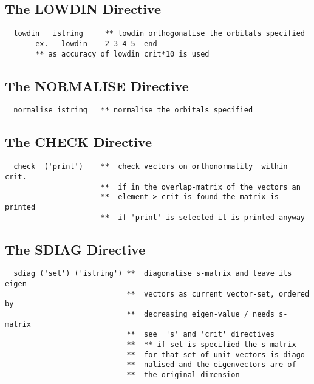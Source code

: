 \documentclass[11pt,fleqn]{article}
\begin{document}
\subsection{The LOWDIN Directive}

{
\footnotesize
\begin{verbatim} 
  lowdin   istring     ** lowdin orthogonalise the orbitals specified
       ex.   lowdin    2 3 4 5  end
       ** as accuracy of lowdin crit*10 is used
\end{verbatim}
}

\subsection{The NORMALISE Directive}

{
\footnotesize
\begin{verbatim} 
  normalise istring   ** normalise the orbitals specified
\end{verbatim}
}

\subsection{The CHECK Directive}

{
\footnotesize
\begin{verbatim} 
  check  ('print')    **  check vectors on orthonormality  within crit.
                      **  if in the overlap-matrix of the vectors an
                      **  element > crit is found the matrix is printed
                      **  if 'print' is selected it is printed anyway
\end{verbatim}
}

\subsection{The SDIAG Directive}

{
\footnotesize
\begin{verbatim} 
  sdiag ('set') ('istring') **  diagonalise s-matrix and leave its eigen-
                            **  vectors as current vector-set, ordered by
                            **  decreasing eigen-value / needs s-matrix
                            **  see  's' and 'crit' directives
                            **  ** if set is specified the s-matrix
                            **  for that set of unit vectors is diago-
                            **  nalised and the eigenvectors are of
                            **  the original dimension
\end{verbatim}
}
\end{document}
